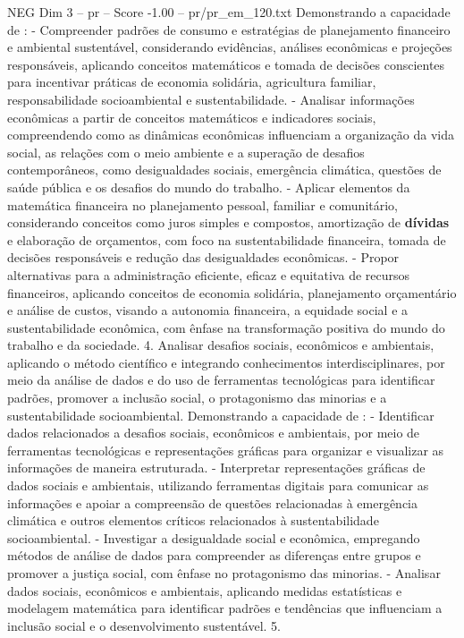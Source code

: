 \begin{textsample}{NEG Dim 3 – pr – Score -1.00 – pr/pr\_em\_120.txt}
Demonstrando a capacidade de : - Compreender padrões de consumo e estratégias de planejamento financeiro e ambiental sustentável, considerando evidências, análises econômicas e projeções responsáveis, aplicando conceitos matemáticos e tomada de decisões conscientes para incentivar práticas de economia solidária, agricultura familiar, responsabilidade socioambiental e sustentabilidade. - Analisar informações econômicas a partir de conceitos matemáticos e indicadores sociais, compreendendo como as dinâmicas econômicas influenciam a organização da vida social, as relações com o meio ambiente e a superação de desafios contemporâneos, como desigualdades sociais, emergência climática, questões de saúde pública e os desafios do mundo do trabalho. - Aplicar elementos da matemática financeira no planejamento pessoal, familiar e comunitário, considerando conceitos como juros simples e compostos, amortização de \textbf{dívidas} e elaboração de orçamentos, com foco na sustentabilidade financeira, tomada de decisões responsáveis e redução das desigualdades econômicas. - Propor alternativas para a administração eficiente, eficaz e equitativa de recursos financeiros, aplicando conceitos de economia solidária, planejamento orçamentário e análise de custos, visando a autonomia financeira, a equidade social e a sustentabilidade econômica, com ênfase na transformação positiva do mundo do trabalho e da sociedade. 4.
Analisar desafios sociais, econômicos e ambientais, aplicando o método científico e integrando conhecimentos interdisciplinares, por meio da análise de dados e do uso de ferramentas tecnológicas para identificar padrões, promover a inclusão social, o protagonismo das minorias e a sustentabilidade socioambiental.
Demonstrando a capacidade de : - Identificar dados relacionados a desafios sociais, econômicos e ambientais, por meio de ferramentas tecnológicas e representações gráficas para organizar e visualizar as informações de maneira estruturada. - Interpretar representações gráficas de dados sociais e ambientais, utilizando ferramentas digitais para comunicar as informações e apoiar a compreensão de questões relacionadas à emergência climática e outros elementos críticos relacionados à sustentabilidade socioambiental. - Investigar a desigualdade social e econômica, empregando métodos de análise de dados para compreender as diferenças entre grupos e promover a justiça social, com ênfase no protagonismo das minorias. - Analisar dados sociais, econômicos e ambientais, aplicando medidas estatísticas e modelagem matemática para identificar padrões e tendências que influenciam a inclusão social e o desenvolvimento sustentável. 5.

\end{textsample}
